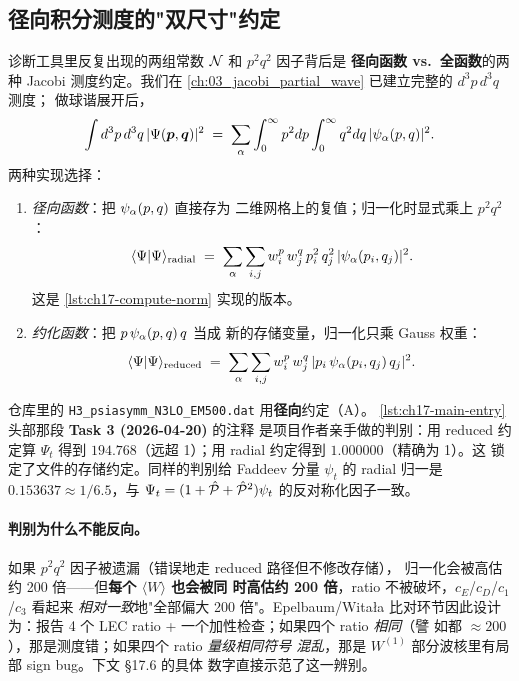 \subsection{径向积分测度的"双尺寸"约定}
\label{subsec:ch17-radial-measure}

诊断工具里反复出现的两组常数 \(\mathcal{N}\) 和 \(p^2 q^2\) 因子背后是
\textbf{径向函数 vs.\ 全函数}的两种 Jacobi 测度约定。我们在
\cref{ch:03_jacobi_partial_wave} 已建立完整的 \(d^3p\, d^3q\) 测度；
做球谐展开后，
\begin{equation}
\label{eq:ch17-measure}
\int d^3 p\, d^3 q\, |\Psi(\bm{p}, \bm{q})|^2
\;=\; \sum_\alpha \int_0^\infty p^2 dp \int_0^\infty q^2 dq\, |\psi_\alpha(p, q)|^2.
\end{equation}
两种实现选择：

\begin{enumerate}
  \item[\textbf{A.}] \emph{径向函数}：把 \(\psi_\alpha(p, q)\) 直接存为
        二维网格上的复值；归一化时显式乘上 \(p^2 q^2\)：
        \[
        \langle\Psi|\Psi\rangle_{\text{radial}}
        \;=\; \sum_\alpha\sum_{i, j} w^p_i\,w^q_j\,p_i^2\,q_j^2\,|\psi_\alpha(p_i, q_j)|^2.
        \]
        这是 \cref{lst:ch17-compute-norm} 实现的版本。

  \item[\textbf{B.}] \emph{约化函数}：把 \(p\,\psi_\alpha(p, q)\,q\) 当成
        新的存储变量，归一化只乘 Gauss 权重：
        \[
        \langle\Psi|\Psi\rangle_{\text{reduced}}
        \;=\; \sum_\alpha\sum_{i, j} w^p_i\,w^q_j\,|p_i\,\psi_\alpha(p_i, q_j)\,q_j|^2.
        \]
\end{enumerate}

仓库里的 \texttt{H3\_psiasymm\_N3LO\_EM500.dat} 用\textbf{径向}约定（A）。
\cref{lst:ch17-main-entry} 头部那段 \textbf{Task 3 (2026-04-20)} 的注释
是项目作者亲手做的判别：用 reduced 约定算 \(\Psi_t\) 得到
\(194.768\)（远超 1）；用 radial 约定得到 \(1.000000\)（精确为 1）。这
锁定了文件的存储约定。同样的判别给 Faddeev 分量 \(\psi_t\) 的
radial 归一是 \(0.153637 \approx 1/6.5\)，与 \(\Psi_t = (1+\hat{\mathcal{P}}+\hat{\mathcal{P}}^2)\psi_t\)
的反对称化因子一致。

\paragraph{判别为什么不能反向。}
如果 \(p^2 q^2\) 因子被遗漏（错误地走 reduced 路径但不修改存储），
归一化会被高估约 200 倍——但\textbf{每个 \(\langle W\rangle\) 也会被同
时高估约 200 倍}，ratio 不被破坏，\(c_E\)/\(c_D\)/\(c_1\)/\(c_3\) 看起来
\emph{相对一致}地"全部偏大 200 倍"。Epelbaum/Witała 比对环节因此设计
为：报告 4 个 LEC ratio + 一个加性检查；如果四个 ratio \emph{相同}（譬
如都 \(\approx 200\)），那是测度错；如果四个 ratio \emph{量级相同符号
混乱}，那是 \(W^{(1)}\) 部分波核里有局部 sign bug。下文 §17.6 的具体
数字直接示范了这一辨别。

